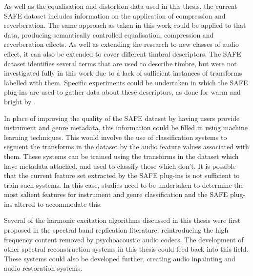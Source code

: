 	As well as the equalisation and distortion data used in this thesis, the current SAFE dataset includes information
	on the application of compression and reverberation. The same approach as taken in this work could be applied to
	that data, producing semantically controlled equalisation, compression and reverberation effects. As well as
	extending the research to new classes of audio effect, it can also be extended to cover different timbral
	descriptors. The SAFE dataset identifies several terms that are used to describe timbre, but were not investigated
	fully in this work due to a lack of sufficient instances of transforms labelled with them. Specific experiments
	could be undertaken in which the SAFE plug-ins are used to gather data about these descriptors, as done for warm and
	bright by \citet{stasis2015a}.

	In place of improving the quality of the SAFE dataset by having users provide instrument and genre metadata, this
	information could be filled in using machine learning techniques. This would involve the use of classification
	systems to segment the transforms in the dataset by the audio feature values associated with them. These systems can
	be trained using the transforms in the dataset which have metadata attached, and used to classify those which don't.
	It is possible that the current feature set extracted by the SAFE plug-ins is not sufficient to train such systems.
	In this case, studies need to be undertaken to determine the most salient features for instrument and genre
	classification and the SAFE plug-ins altered to accommodate this.

	Several of the harmonic excitation algorithms discussed in this thesis were first proposed in the spectral band
	replication literature: reintroducing the high frequency content removed by psychoacoustic audio codecs. The
	development of other spectral reconstruction systems in this thesis could feed back into this field. These systems
	could also be developed further, creating audio inpainting and audio restoration systems.


